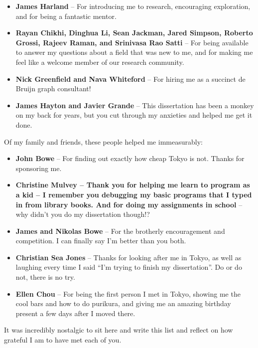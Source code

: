 \begin{itemize}
\item \textbf{James Harland} -- For introducing me to research, encouraging exploration, and for being a fantastic mentor.
\item \textbf{Rayan Chikhi, Dinghua Li, Sean Jackman, Jared Simpson, Roberto Grossi, Rajeev Raman, and Srinivasa Rao Satti} -- For being available to answer my questions about a field that was new to me, and for making me feel like a welcome member of our research community.
\item \textbf{Nick Greenfield and Nava Whiteford} -- For hiring me as a succinct de Bruijn graph consultant!
\item \textbf{James Hayton and Javier Grande} -- This dissertation has been a monkey on my back for years, but you cut through my anxieties and helped me get it done.
\end{itemize}

Of my family and friends, these people helped me immeasurably:

\begin{itemize}
\item \textbf{John Bowe} -- For finding out exactly how cheap Tokyo is not. Thanks for sponsoring me.
\item \textbf{Christine Mulvey -- Thank you for helping me learn to program as a kid -- I remember you debugging my basic programs that I typed in from library books. And for doing my assignments in school} -- why didn’t you do my dissertation though!?
\item \textbf{James and Nikolas Bowe} -- For the brotherly encouragement and competition. I can finally say I’m better than you both.
\item \textbf{Christian Sea Jones} -- Thanks for looking after me in Tokyo, as well as laughing every time I said “I’m trying to finish my dissertation”. Do or do not, there is no try.
\item \textbf{Ellen Chou} -- For being the first person I met in Tokyo, showing me the cool bars and how to do purikura, and giving me an amazing birthday present a few days after I moved there.
\end{itemize}

It was incredibly nostalgic to sit here and write this list and reflect on how grateful I am to have met each of you.
